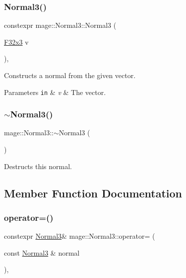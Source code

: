 \subsubsection{\texorpdfstring{Normal3()}{Normal3()}\hspace{0.1cm}{\footnotesize\ttfamily [5/5]}}
{\footnotesize\ttfamily constexpr mage\+::\+Normal3\+::\+Normal3 (\begin{DoxyParamCaption}\item[{\mbox{\hyperlink{namespacemage_a0fef5ab4e073c2d9ea876fefa3da4233}{F32x3}}}]{v }\end{DoxyParamCaption})\hspace{0.3cm}{\ttfamily [explicit]}, {\ttfamily [noexcept]}}

Constructs a normal from the given vector.


\begin{DoxyParams}[1]{Parameters}
\mbox{\tt in}  & {\em v} & The vector. \\
\hline
\end{DoxyParams}
\mbox{\label{structmage_1_1_normal3_a3384b2970fd85fe729514ce0686b4446}} 
\subsubsection{\texorpdfstring{$\sim$\+Normal3()}{~Normal3()}}
{\footnotesize\ttfamily mage\+::\+Normal3\+::$\sim$\+Normal3 (\begin{DoxyParamCaption}{ }\end{DoxyParamCaption})\hspace{0.3cm}{\ttfamily [default]}}

Destructs this normal. 

\subsection{Member Function Documentation}
\mbox{\label{structmage_1_1_normal3_aeeb43d61c914bc975c22e059b8bbeec9}} 
\subsubsection{\texorpdfstring{operator=()}{operator=()}\hspace{0.1cm}{\footnotesize\ttfamily [1/2]}}
{\footnotesize\ttfamily constexpr \mbox{\hyperlink{structmage_1_1_normal3}{Normal3}}\& mage\+::\+Normal3\+::operator= (\begin{DoxyParamCaption}\item[{const \mbox{\hyperlink{structmage_1_1_normal3}{Normal3}} \&}]{normal }\end{DoxyParamCaption})\hspace{0.3cm}{\ttfamily [default]}, {\ttfamily [noexcept]}}

